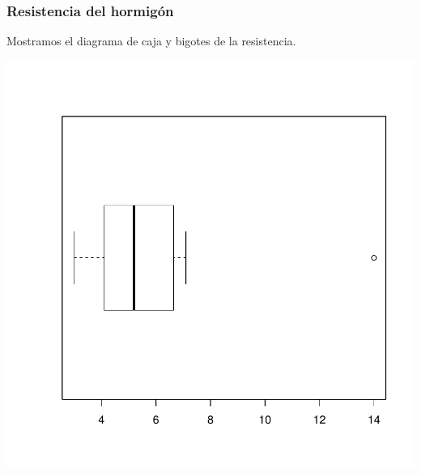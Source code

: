 \documentclass [a4paper] {article}
\begin{document}
\subsubsection{Resistencia del hormigón}
Mostramos el diagrama de caja y bigotes de la resistencia.
\begin{center}
\includegraphics{entrega-plot_caja_bigotes_resistencia}
\end{center}
\end{document}
